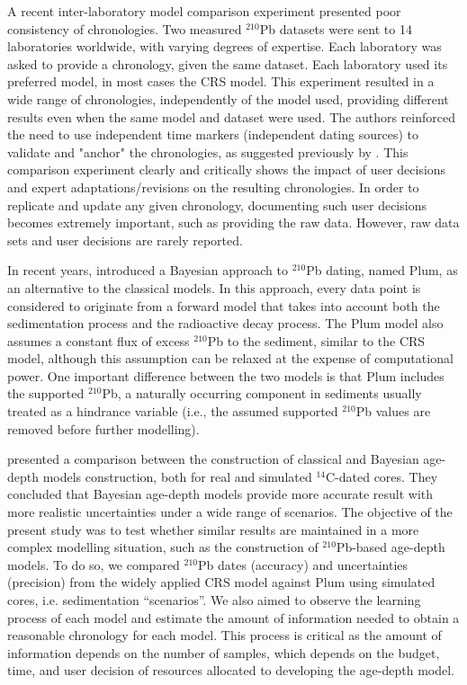 \documentclass [10pt] {article}
\begin{document}
	A recent inter-laboratory model comparison experiment \citep{Barsanti2020}presented poor consistency of chronologies.
Two measured $^{210}$Pb datasets were sent to 14 laboratories worldwide, with varying degrees of expertise. Each laboratory was asked to provide a chronology, given the same dataset. Each laboratory used its preferred model, in most cases the CRS model. This experiment resulted in a wide range of chronologies, independently of the model used, providing different results even when the same model and dataset were used. The authors reinforced the need to use independent time markers (independent dating sources) to validate and "anchor" the chronologies, as suggested previously by \citet{Smith2001}.  
This comparison experiment clearly and critically shows the impact of user decisions and expert adaptations/revisions on the resulting chronologies. In order to replicate and update any given chronology, documenting such user decisions becomes extremely important, such as providing the raw data. However, raw data sets and user decisions are rarely reported.

In recent years, \citet{Aquino2018} introduced a Bayesian approach to $^{210}$Pb dating, named Plum, as an alternative to the classical models. In this approach, every data point is considered to originate from a forward model that takes into account both the sedimentation process and the radioactive decay process. The Plum model also assumes a constant flux of excess $^{210}$Pb to the sediment, similar to the CRS model, although this assumption can be relaxed at the expense of computational power. One important difference between the two models is that Plum includes the supported $^{210}$Pb, a naturally occurring component in sediments usually treated as a hindrance variable (i.e., the assumed supported $^{210}$Pb values are removed before further modelling).

	\citet{Blaauw2018} presented a comparison between the construction of classical and Bayesian age-depth models construction, both for real and simulated $^{14}$C-dated cores.
They concluded that Bayesian age-depth models provide more accurate result with more realistic uncertainties under a wide range of scenarios.  
The objective of the present study was to test whether similar results are maintained in a more complex modelling situation, such as the construction of $^{210}$Pb-based age-depth models.
To do so, we compared $^{210}$Pb dates (accuracy) and uncertainties (precision) from the widely applied CRS model against Plum using simulated cores, i.e. sedimentation ``scenarios''.
We also aimed to observe the learning process of each model and estimate the amount of information needed to obtain a reasonable chronology for each model.
This process is critical as the amount of information depends on the number of samples, which depends on the budget, time, and user decision of resources allocated to developing the age-depth model.
\end{document}

